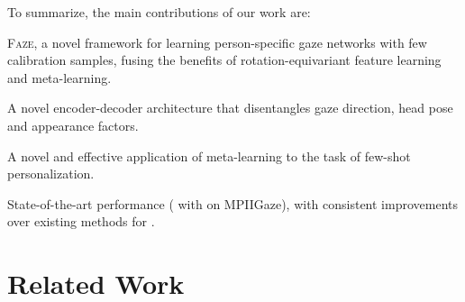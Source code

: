 \documentclass[10pt,twocolumn,letterpaper]{article}
\newcommand{\faze}[0]{\textsc{Faze}\xspace}
\begin{document}
\noindent To summarize, the main contributions of our work are: 
\begin{compactitem}
\item \faze, a novel framework for learning person-specific gaze networks with few calibration samples, fusing the benefits of rotation-equivariant feature learning and meta-learning.
\item A novel encoder-decoder architecture that disentangles gaze direction, head pose and appearance factors.
\item A novel and effective application of meta-learning to the task of few-shot personalization.
\item State-of-the-art performance ( with  on MPIIGaze), with consistent improvements over existing methods for . 

\end{compactitem}




































 
\section{Related Work}
\end{document}
